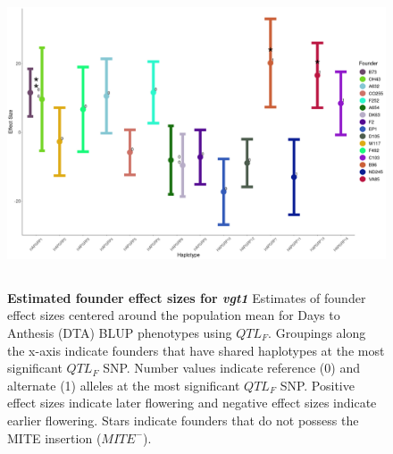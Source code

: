 \documentclass[article,9pt,twocolumn,twoside]{rilabRxiv}
\begin{document}
\begin{figure}[ht!]
\centering
\includegraphics[width=\linewidth,height=9cm]{figures/vgt1_Figure4.png}
\caption{\textbf{Estimated founder effect sizes for \emph{vgt1}} Estimates of founder effect sizes centered around the population mean for Days to Anthesis (DTA) BLUP phenotypes using $QTL_F$. Groupings along the x-axis indicate founders that have shared haplotypes at the most significant $QTL_F$ SNP. Number values indicate reference (0) and alternate (1) alleles at the most significant $QTL_F$ SNP. Positive effect sizes indicate later flowering and negative effect sizes indicate earlier flowering. Stars indicate founders that do not possess the MITE insertion ($MITE^-$).}
\label{fig:foundervgt1figure}
\end{figure}
\end{document}
